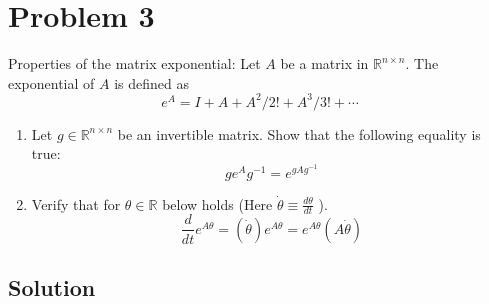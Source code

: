 \section*{Problem 3}

Properties of the matrix exponential:
Let \( A \) be a matrix in \( \mathbb{R}^{n \times n} \).
The exponential of \( A \) is defined as
\begin{equation*}
    e^{A}=I+A+A^{2} / 2!+A^{3} / 3!+\cdots
\end{equation*}
\begin{enumerate}[label= (\alph*)]
    \item Let \( g \in \mathbb{R}^{n \times n} \) be an invertible matrix. Show that the following equality is true:
          \begin{equation*}
              g e^{A} g^{-1}=e^{g A g^{-1}}
          \end{equation*}

    \item Verify that for \( \theta \in \mathbb{R} \) below holds (Here \( \dot{\theta} \equiv \frac{d \theta}{d t} \) ).
          \begin{equation*}
              \frac{d}{d t} e^{A \theta}=(\dot{\theta}) e^{A \theta}=e^{A \theta}(A \dot{\theta})
          \end{equation*}
\end{enumerate}

\subsection*{Solution}
